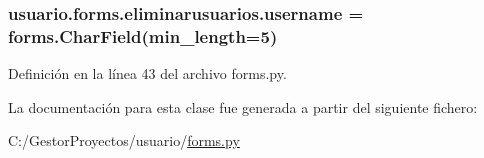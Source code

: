 \subsubsection[{\texorpdfstring{username}{username}}]{\setlength{\rightskip}{0pt plus 5cm}usuario.\+forms.\+eliminarusuarios.\+username = forms.\+Char\+Field(min\+\_\+length=5)\hspace{0.3cm}{\ttfamily [static]}}\hypertarget{classusuario_1_1forms_1_1eliminarusuarios_a11c4733a1499a690090fef31269bd828}{}\label{classusuario_1_1forms_1_1eliminarusuarios_a11c4733a1499a690090fef31269bd828}


Definición en la línea 43 del archivo forms.\+py.



La documentación para esta clase fue generada a partir del siguiente fichero\+:\begin{DoxyCompactItemize}
\item 
C\+:/\+Gestor\+Proyectos/usuario/\hyperlink{usuario_2forms_8py}{forms.\+py}\end{DoxyCompactItemize}
